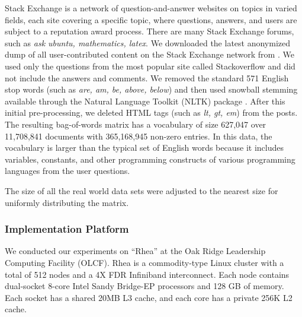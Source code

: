 \begin{itemize}
Stack Exchange is a network of question-and-answer websites on topics in varied fields, each site covering a specific topic, where questions, answers, and users are subject to a reputation award process. There are many Stack Exchange forums, such as {\em ask ubuntu, mathematics, latex}. 
We downloaded the latest anonymized dump of all 
user-contributed content on the Stack Exchange network from \cite{stkxchngdataset}. 
We used only the questions from the most popular site called Stackoverflow and did not include the answers and comments. 
We removed the standard 571 English stop words (such as {\em are, am, be, above, below}) and then used snowball stemming available through the Natural Language Toolkit (NLTK) package \cite{LB2002}.
After this initial pre-processing, we deleted HTML tags (such as {\em lt, gt, em}) from the posts. 
The resulting bag-of-words matrix has a vocabulary of size 627,047 over 11,708,841 documents with 365,168,945 non-zero entries. 
In this data, the vocabulary is larger than the typical set of English words because it includes variables, constants, and other programming constructs of various programming languages from the user questions.
\end{itemize}

The size of all the real world data sets were adjusted to the nearest size for uniformly distributing the matrix. 

\subsubsection{Implementation Platform}

We conducted our experiments on ``Rhea'' at the Oak Ridge Leadership Computing Facility (OLCF).
Rhea is a commodity-type Linux cluster with a total of 512 nodes and a 4X FDR Infiniband interconnect.
Each node contains dual-socket 8-core Intel Sandy Bridge-EP processors and 128 GB of memory.
Each socket has a shared 20MB L3 cache, and each core has a private 256K L2 cache. 


